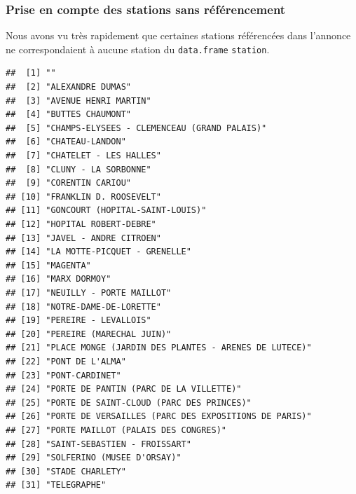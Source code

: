 \documentclass[french,]{article}
\newenvironment{Shaded}{\begin{snugshade}}{\end{snugshade}}
\newcommand{\CommentTok}[1]{\textcolor[rgb]{0.56,0.35,0.01}{\textit{#1}}}
\newcommand{\KeywordTok}[1]{\textcolor[rgb]{0.13,0.29,0.53}{\textbf{#1}}}
\newcommand{\NormalTok}[1]{#1}
\newcommand{\OperatorTok}[1]{\textcolor[rgb]{0.81,0.36,0.00}{\textbf{#1}}}
\begin{document}
\hypertarget{prise-en-compte-des-stations-sans-ruxe9fuxe9rencement}{%
\subsubsection{Prise en compte des stations sans
référencement}\label{prise-en-compte-des-stations-sans-ruxe9fuxe9rencement}}

Nous avons vu très rapidement que certaines stations référencées dans
l'annonce ne correspondaient à aucune station du \texttt{data.frame}
\texttt{station}.

\begin{Shaded}
\end{Shaded}

\begin{verbatim}
##  [1] ""                                                   
##  [2] "ALEXANDRE DUMAS"                                    
##  [3] "AVENUE HENRI MARTIN"                                
##  [4] "BUTTES CHAUMONT"                                    
##  [5] "CHAMPS-ELYSEES - CLEMENCEAU (GRAND PALAIS)"         
##  [6] "CHATEAU-LANDON"                                     
##  [7] "CHATELET - LES HALLES"                              
##  [8] "CLUNY - LA SORBONNE"                                
##  [9] "CORENTIN CARIOU"                                    
## [10] "FRANKLIN D. ROOSEVELT"                              
## [11] "GONCOURT (HOPITAL-SAINT-LOUIS)"                     
## [12] "HOPITAL ROBERT-DEBRE"                               
## [13] "JAVEL - ANDRE CITROEN"                              
## [14] "LA MOTTE-PICQUET - GRENELLE"                        
## [15] "MAGENTA"                                            
## [16] "MARX DORMOY"                                        
## [17] "NEUILLY - PORTE MAILLOT"                            
## [18] "NOTRE-DAME-DE-LORETTE"                              
## [19] "PEREIRE - LEVALLOIS"                                
## [20] "PEREIRE (MARECHAL JUIN)"                            
## [21] "PLACE MONGE (JARDIN DES PLANTES - ARENES DE LUTECE)"
## [22] "PONT DE L'ALMA"                                     
## [23] "PONT-CARDINET"                                      
## [24] "PORTE DE PANTIN (PARC DE LA VILLETTE)"              
## [25] "PORTE DE SAINT-CLOUD (PARC DES PRINCES)"            
## [26] "PORTE DE VERSAILLES (PARC DES EXPOSITIONS DE PARIS)"
## [27] "PORTE MAILLOT (PALAIS DES CONGRES)"                 
## [28] "SAINT-SEBASTIEN - FROISSART"                        
## [29] "SOLFERINO (MUSEE D'ORSAY)"                          
## [30] "STADE CHARLETY"                                     
## [31] "TELEGRAPHE"
\end{verbatim}
\end{document}
